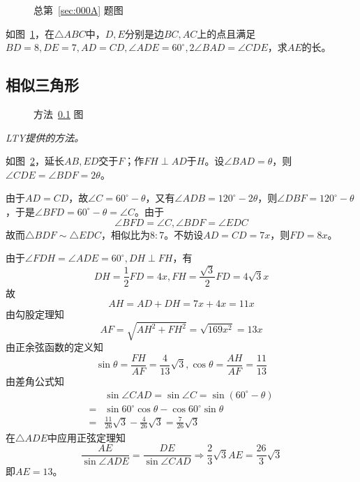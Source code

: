 

\begin{figure}[htbp]
  \centering {}
  \caption{总第~\ref{sec:000A} 题图} \label{fig:000A}
\end{figure}

如图~\ref{fig:000A}，在$\triangle ABC$中，$D, E$分别是边$BC, AC$上的点且满足$BD = 8, DE = 7, AD = CD, \angle ADE = 60^\circ, 2\angle BAD = \angle CDE$，求$AE$的长。


\subsection{相似三角形} \label{subsec:000A-sim}

\begin{figure}[htbp]
  \centering {}
  \caption{方法~\ref{subsec:000A-sim} 图} \label{fig:000A-sim}
\end{figure}

\emph{LTY提供的方法。}

如图~\ref{fig:000A-sim}，延长$AB, ED$交于$F$；作$FH \perp AD$于$H$。设$\angle BAD = \theta$，则$\angle CDE = \angle BDF = 2\theta$。

由于$AD = CD$，故$\angle C = 60^\circ - \theta$，又有$\angle ADB = 120^\circ - 2\theta$，则$\angle DBF = 120^\circ - \theta$，于是$\angle BFD = 60^\circ - \theta = \angle C$。由于
\[ \angle BFD = \angle C, \angle BDF = \angle EDC \]
故而$\triangle BDF \sim \triangle EDC$，相似比为$8:7$。不妨设$AD = CD = 7x$，则$FD = 8x$。

由于$\angle FDH = \angle ADE = 60^\circ, DH \perp FH$，有
\[ DH = \frac12FD = 4x, FH = \frac{\sqrt3}2FD = 4\sqrt3x \]
故
\[ AH = AD + DH = 7x + 4x = 11x \]
由勾股定理知
\[ AF = \sqrt{AH^2 + FH^2} = \sqrt{169x^2} = 13x \]
由正余弦函数的定义知
\[ \sin\theta = \frac{FH}{AF} = \frac4{13}\sqrt3, \cos\theta = \frac{AH}{AF} = \frac{11}{13} \]
由差角公式知
\begin{align*}
  & \sin\angle CAD = \sin\angle C = \sin(60^\circ - \theta) \\
  ={}& \sin60^\circ\cos\theta - \cos60^\circ\sin\theta \\
  ={}& \frac{11}{26}\sqrt3 - \frac4{26}\sqrt3 = \frac7{26}\sqrt3
\end{align*}
在$\triangle ADE$中应用正弦定理知
\[ \frac{AE}{\sin\angle ADE} = \frac{DE}{\sin\angle CAD} \Rightarrow \frac23\sqrt3AE = \frac{26}3\sqrt3 \]
即$AE = 13$。

